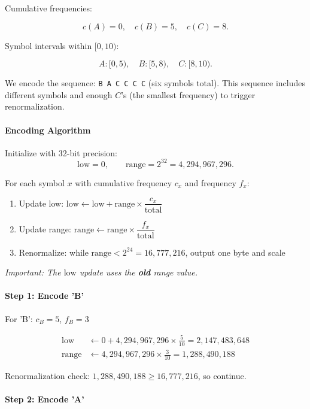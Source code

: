 Cumulative frequencies:

\[
c(A) = 0,\quad c(B) = 5,\quad c(C) = 8.
\]

Symbol intervals within $[0,10)$:

\[
A: [0,5),\quad B: [5,8),\quad C: [8,10).
\]

We encode the sequence: \texttt{B A C C C C} (six symbols total). This sequence includes different symbols and enough $C$'s (the smallest frequency) to trigger renormalization.

\paragraph{Encoding Algorithm}

Initialize with 32-bit precision:
\[
\text{low} = 0,\qquad \text{range} = 2^{32} = 4{,}294{,}967{,}296.
\]

For each symbol $x$ with cumulative frequency $c_x$ and frequency $f_x$:

\begin{enumerate}
    \item Update low: $\text{low} \gets \text{low} + \text{range} \times \dfrac{c_x}{\text{total}}$
    \item Update range: $\text{range} \gets \text{range} \times \dfrac{f_x}{\text{total}}$
    \item Renormalize: while $\text{range} < 2^{24} = 16{,}777{,}216$, output one byte and scale
\end{enumerate}

\emph{Important: The $\text{low}$ update uses the \textbf{old} range value.}

\paragraph{Step 1: Encode 'B'}

For 'B': $c_B = 5$, $f_B = 3$

\[
\begin{aligned}
\text{low} &\gets 0 + 4{,}294{,}967{,}296 \times \frac{5}{10} = 2{,}147{,}483{,}648 \\
\text{range} &\gets 4{,}294{,}967{,}296 \times \frac{3}{10} = 1{,}288{,}490{,}188
\end{aligned}
\]

Renormalization check: $1{,}288{,}490{,}188 \ge 16{,}777{,}216$, so continue.

\paragraph{Step 2: Encode 'A'}

